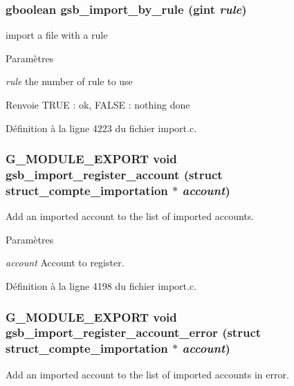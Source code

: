 \subsubsection[{gsb\_\-import\_\-by\_\-rule}]{\setlength{\rightskip}{0pt plus 5cm}gboolean gsb\_\-import\_\-by\_\-rule (gint {\em rule})}\label{import_8h_a83937dc8d19317b124055841c3fd61a6}
import a file with a rule


\begin{DoxyParams}{Paramètres}
\item[{\em rule}]the number of rule to use\end{DoxyParams}
\begin{DoxyReturn}{Renvoie}
TRUE : ok, FALSE : nothing done 
\end{DoxyReturn}


Définition à la ligne 4223 du fichier import.c.

\subsubsection[{gsb\_\-import\_\-register\_\-account}]{\setlength{\rightskip}{0pt plus 5cm}G\_\-MODULE\_\-EXPORT void gsb\_\-import\_\-register\_\-account (struct {\bf struct\_\-compte\_\-importation} $\ast$ {\em account})}\label{import_8h_a20d9d366175a0b8a38fb710d74df63b4}
Add an imported account to the list of imported accounts.


\begin{DoxyParams}{Paramètres}
\item[{\em account}]Account to register. \end{DoxyParams}


Définition à la ligne 4198 du fichier import.c.

\subsubsection[{gsb\_\-import\_\-register\_\-account\_\-error}]{\setlength{\rightskip}{0pt plus 5cm}G\_\-MODULE\_\-EXPORT void gsb\_\-import\_\-register\_\-account\_\-error (struct {\bf struct\_\-compte\_\-importation} $\ast$ {\em account})}\label{import_8h_a4bfa72d8a4cd4f0cb17bcce05e286607}
Add an imported account to the list of imported accounts in error.


